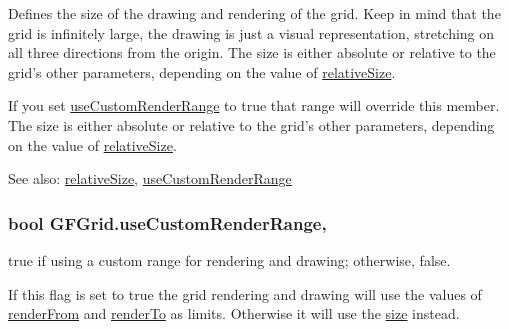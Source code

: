 Defines the size of the drawing and rendering of the grid. Keep in mind that the grid is infinitely large, the drawing is just a visual representation, stretching on all three directions from the origin. The size is either absolute or relative to the grid's other parameters, depending on the value of \hyperlink{class_g_f_grid_a65d207e3957240c935645db01a199419_a65d207e3957240c935645db01a199419}{relative\+Size}.

If you set \hyperlink{class_g_f_grid_acb950aa31097c85e153cd9a642900a31_acb950aa31097c85e153cd9a642900a31}{use\+Custom\+Render\+Range} to {\ttfamily true} that range will override this member. The size is either absolute or relative to the grid's other parameters, depending on the value of \hyperlink{class_g_f_grid_a65d207e3957240c935645db01a199419_a65d207e3957240c935645db01a199419}{relative\+Size}.

See also\+: \hyperlink{class_g_f_grid_a65d207e3957240c935645db01a199419_a65d207e3957240c935645db01a199419}{relative\+Size}, \hyperlink{class_g_f_grid_acb950aa31097c85e153cd9a642900a31_acb950aa31097c85e153cd9a642900a31}{use\+Custom\+Render\+Range} \hypertarget{class_g_f_grid_acb950aa31097c85e153cd9a642900a31_acb950aa31097c85e153cd9a642900a31}{
\subsubsection[{use\+Custom\+Render\+Range}]{\setlength{\rightskip}{0pt plus 5cm}bool G\+F\+Grid.\+use\+Custom\+Render\+Range\hspace{0.3cm}{\ttfamily [get]}, {\ttfamily [set]}}}\label{class_g_f_grid_acb950aa31097c85e153cd9a642900a31_acb950aa31097c85e153cd9a642900a31}
{\ttfamily true} if using a custom range for rendering and drawing; otherwise, {\ttfamily false}.

If this flag is set to {\ttfamily true} the grid rendering and drawing will use the values of \hyperlink{class_g_f_grid_a4556eac3905975b9024addb169c629d8_a4556eac3905975b9024addb169c629d8}{render\+From} and \hyperlink{class_g_f_grid_af9ec4b040505718f58a7841087d9b72a_af9ec4b040505718f58a7841087d9b72a}{render\+To} as limits. Otherwise it will use the \hyperlink{class_g_f_grid_a336f54e5b5f677871876dc3d90cc611d_a336f54e5b5f677871876dc3d90cc611d}{size} instead. 


